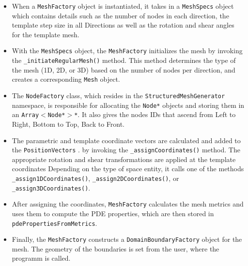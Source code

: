 \documentclass{article}
\begin{document}
\begin{itemize}

	\item When a \texttt{MeshFactory} object is instantiated, it takes in a \texttt{MeshSpecs} object which contains details such as the number of nodes in each direction, the template step size in all Directions as well as the rotation and shear angles for the template mesh.
	
	\item With the \texttt{MeshSpecs} object, the \texttt{MeshFactory} initializes the mesh by invoking the \newline \texttt{\_initiateRegularMesh()} method. This method determines the type of the mesh (1D, 2D, or 3D) based on the number of nodes per direction, and creates a corresponding \texttt{Mesh} object.
	
	
	
	\item The \texttt{NodeFactory} class, which resides in the \texttt{StructuredMeshGenerator} namespace, is responsible for allocating the \texttt{Node*} objects and storing them in an \texttt{Array$<$\texttt{Node}*$>$*}. It also gives the nodes IDs that ascend from Left to Right, Bottom to Top, Back to Front.
	
	\item The parametric and template coordinate vectors are calculated and added to the \texttt{PositionVectors} . by invoking the \texttt{\_assignCoordinates()} method. The appropriate rotation and shear transformations are applied at the template coordinates Depending on the type of space entity, it calls one of the methods \texttt{\_assign1DCoordinates()}, \texttt{\_assign2DCoordinates()}, or \texttt{\_assign3DCoordinates()}.
	
	
	\item After assigning the coordinates, \texttt{MeshFactory} calculates the mesh metrics and uses them to compute the PDE properties, which are then stored in \texttt{pdePropertiesFromMetrics}.
	
	\item Finally, the \texttt{MeshFactory} constructs a \texttt{DomainBoundaryFactory} object for the mesh. The geometry of the boundaries is set from the user, where the programm is called.


\end{itemize}

	
\end{document}
